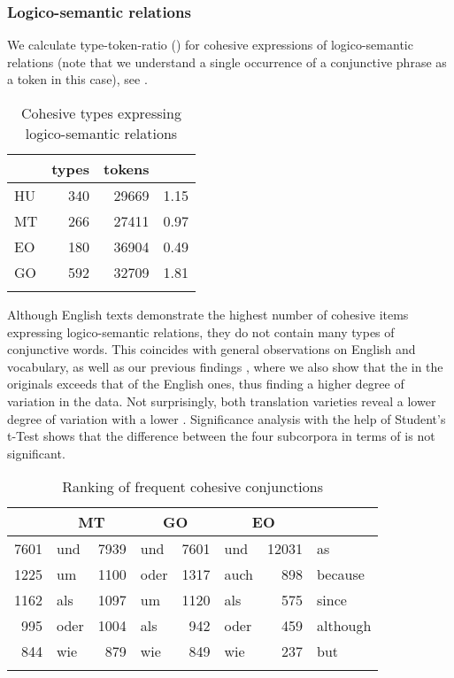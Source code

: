 \documentclass[output=paper]{langsci/langscibook.cls}
\begin{document}
\subsubsection{Logico-semantic relations}

We calculate type-token-ratio () for cohesive expressions of logico-semantic relations (note that we understand a single occurrence of a conjunctive phrase as a token in this case), see .

\begin{table}

\begin{tabular}{lrrr}
\lsptoprule
	&	types&tokens&\isi{TTR}\\
\midrule
HU	&	340&29669&1.15\\
MT	&	266&27411&0.97\\
EO	&	180&36904&0.49\\
GO	&	592&32709&1.81\\
\lspbottomrule
\end{tabular}
\caption{Cohesive types expressing logico-semantic relations}
\label{table:ttrlogsem}
\end{table}

Although English texts demonstrate the highest number of cohesive items expressing logico-semantic relations, they do not contain many types of conjunctive words. This coincides with general observations on English and  vocabulary, as well as our previous findings \citep{KunzLapshinova2014}, where we also show that the  in the  originals exceeds that of the English ones, thus finding a higher degree of variation in the  data. %
Not surprisingly, both translation varieties reveal a lower degree of variation with a lower . Significance analysis with the help of Student's t-Test shows that the difference between the four subcorpora in terms of  is not significant.

\begin{table}

\begin{tabular}{rlrlrlrl}
\lsptoprule
\multicolumn{2}{c}{\bf HT}&\multicolumn{2}{c}{\bf MT}&\multicolumn{2}{c}{\bf GO}&\multicolumn{2}{c}{\bf EO\hspace*{.5cm}}\\
\midrule
7601&und & 7939&und & 7601&und &  12031&as \\

1225&um & 1100&oder & 1317&auch & 898&because\\

1162&als & 1097&um & 1120&als & 575&since\\

995&oder & 1004&als & 942&oder & 459&although\\

844&wie & 879&wie & 849&wie & 237&but\\
\lspbottomrule
\end{tabular}
\caption{Ranking of frequent cohesive conjunctions}
\label{table:freqconj}
\end{table}
\end{document}
